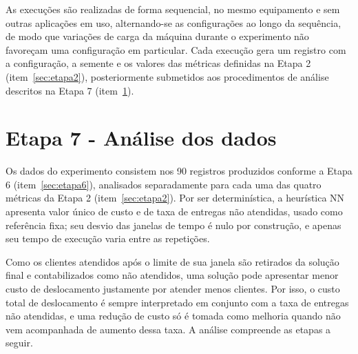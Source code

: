 As execuções são realizadas de forma sequencial, no mesmo equipamento e sem outras
aplicações em uso, alternando-se as configurações ao longo da sequência, de modo que
variações de carga da máquina durante o experimento não favoreçam uma configuração em
particular. Cada execução gera um registro com a configuração, a semente e os valores das
métricas definidas na Etapa 2 (item~\ref{sec:etapa2}), posteriormente submetidos aos
procedimentos de análise descritos na Etapa 7 (item~\ref{sec:etapa7}).

\section{Etapa 7 - Análise dos dados}
\label{sec:etapa7}

Os dados do experimento consistem nos 90 registros produzidos conforme a Etapa 6
(item~\ref{sec:etapa6}), analisados separadamente para cada uma das quatro métricas da
Etapa 2 (item~\ref{sec:etapa2}). Por ser determinística, a heurística NN apresenta valor
único de custo e de taxa de entregas não atendidas, usado como referência fixa; seu
desvio das janelas de tempo é nulo por construção, e apenas seu tempo de execução varia
entre as repetições.

Como os clientes atendidos após o limite de sua janela são retirados da solução final e
contabilizados como não atendidos, uma solução pode apresentar menor custo de
deslocamento justamente por atender menos clientes. Por isso, o custo total de
deslocamento é sempre interpretado em conjunto com a taxa de entregas não atendidas, e
uma redução de custo só é tomada como melhoria quando não vem acompanhada de aumento
dessa taxa. A análise compreende as etapas a seguir.

